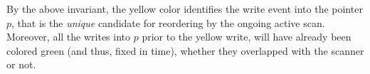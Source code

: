 By the above invariant, the yellow color identifies the write event
into the pointer $p$, that is the \emph{unique} candidate for
reordering by the ongoing active scan. Moreover, all the writes into
$p$ prior to the yellow write, will have already been colored green
(and thus, fixed in time), whether they overlapped with the scanner or
not.

\begin{comment}
\begin{proposition}[First Forwarding Principle]\label{inv:fwd1}%
If the scanner state is $\sss = \sOff\ \toff, \spp = \TT$, then
$\forall\ t \in \histp\ldot\ t \leq \E(t)< \toff \implies \C(t)=
\mathsf{green}$.
\end{proposition}
%
The above is our mathematical formulation approximating the
equally-named, but only informally stated property of
Jayanti~\cite{Jayanti:STOC05}, which says that if \jyscan~misses the
value of a concurrent write in lines~lineScanReadsY
and/or~\lineScanReadsY of Figure~\ref{fig:jayanti-snapshot}, but the
write finishes before the scanner goes through line~\lineScanUnsetsS
(the scan's linearization point), then the scanner will catch the
value in by reading from the forwarding pointer in
lines~\lineScanReadsFX and/or \lineScanReadsFY. In our setting, this
is captured by saying that a write event that finished before $\toff$,
is green. The write event may have been yellow in the past, but the
act of forwarding will paint it green. We will see in
Section~\ref{sc:implementation} that auxiliary code for forwarding
will do just that.


Conversely, Jayanti's Second Principle states that any non-$\bot$
value read in lines~\lineScanReadsX and/or~\lineScanReadsY comes from
a write event that is concurrent with the scan. Moreover, any later
write to the same pointer will finish after the linearization point of
\jyscan~in line~\lineScanUnsetsS, and hence will be missed by the
scanner. While we do not formally capture exactly this property, we
approximate it with the following two invariants, which are
sufficient.

\end{comment}

